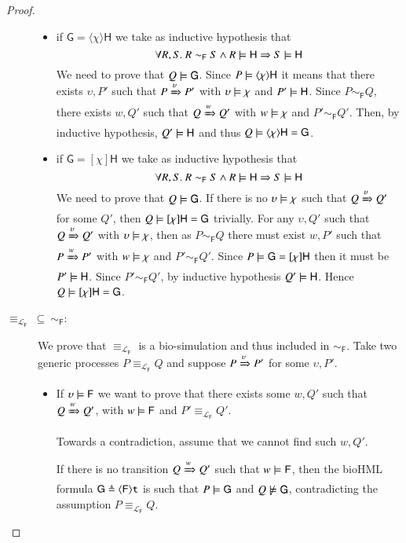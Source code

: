 \begin{proof}
\begin{description}
\begin{itemize}
\item
if $\mathsf{G}=\langle\chi\rangle \mathsf{H}$ we take as inductive hypothesis that
$$
\forall R,S.\ R \sim_{\mathsf{F}} S \wedge R\models \mathsf{H} \Rightarrow S \models \mathsf{H}
$$
We need to prove that $Q\models \mathsf{G}$.
Since $P\models \langle\chi\rangle \mathsf{H}$ it means that there exists $\upsilon, P'$ such that $P\xRightarrow{\upsilon} P'$ with $\upsilon\models \chi$ and $P'\models \mathsf{H}$.
Since $P\sim_{\mathsf{F}} Q$, there exists $w,Q'$ such that $Q\xRightarrow{w} Q'$ with $w\models \chi$ and $P'\sim_{\mathsf{F}} Q'$. Then, by inductive hypothesis, $Q'\models \mathsf{H}$ and thus $Q\models \langle\chi\rangle \mathsf{H}=\mathsf{G}$.

\item
if $\mathsf{G}=[\chi] \mathsf{H}$ we take as inductive hypothesis that
$$
\forall R,S.\ R \sim_{\mathsf{F}} S \wedge R\models \mathsf{H} \Rightarrow S \models \mathsf{H}
$$
We need to prove that $Q\models \mathsf{G}$.
If there is no $\upsilon\models \chi$ such that $Q\xRightarrow{\upsilon}Q'$ for some $Q'$, then 
 $Q\models [\chi] \mathsf{H}=\mathsf{G}$ trivially.
For any $\upsilon,Q'$ such that $Q\xRightarrow{\upsilon}Q'$ with $\upsilon\models \chi$, then as $P\sim_{\mathsf{F}} Q$ there must exist $w,P'$ such that $P\xRightarrow{w}P'$ with $w\models \chi$ and $P'\sim_{\mathsf{F}} Q'$. Since $P\models \mathsf{G}=[\chi] \mathsf{H}$ then it must be $P'\models \mathsf{H}$. Since $P'\sim_{\mathsf{F}} Q'$, by inductive hypothesis $Q'\models \mathsf{H}$. Hence $Q\models [\chi] \mathsf{H} = \mathsf{G}$.
\end{itemize}

\item[$\equiv_{\mathcal{L}_{\mathsf{F}}}\ \subseteq\ \sim_{\mathsf{F}}$:]
We prove that $\equiv_{\mathcal{L}_{\mathsf{F}}}$ is a bio-simulation and thus included in $\sim_{\mathsf{F}}$.
Take two generic processes $P\equiv_{\mathcal{L}_{\mathsf{F}}} Q$ and suppose $P\xRightarrow{\upsilon}P'$ for some $\upsilon,P'$. 
\begin{itemize}
\item
If $\upsilon \models \mathsf{F}$ we want to prove that there exists some $w,Q'$ such that $Q\xRightarrow{w}Q'$, with $w\models \mathsf{F}$ and $P'\equiv_{\mathcal{L}_{\mathsf{F}}} Q'$.

Towards a contradiction, assume that we cannot find such $w,Q'$.

If there is no transition $Q\xRightarrow{w}Q'$ such that $w\models \mathsf{F}$, then the bioHML formula $\mathsf{G} \triangleq \langle \mathsf{F}\rangle{\tt t}$ is such that $P\models \mathsf{G}$ and $Q\not\models \mathsf{G}$, contradicting the assumption $P\equiv_{\mathcal{L}_{\mathsf{F}}} Q$.


\end{itemize}
\end{description}
\end{proof}
